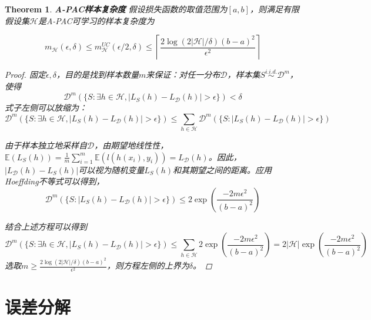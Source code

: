 \documentclass{article}
\newtheorem{theorem}{Theorem}
\newtheorem*{proof}{Proof}
\begin{document}
	\begin{theorem}
	\textbf{A-PAC样本复杂度} 假设损失函数的取值范围为$[a,b]$，则满足有限假设集$\mathcal{H}$是A-PAC可学习的样本复杂度为
	
	\begin{equation}
	m_\mathcal{H}(\epsilon,\delta)\leq m^{UC}_\mathcal{H}(\epsilon/2,\delta)\leq\left\lceil\frac{2\log(2|\mathcal{H}|/\delta)(b-a)^2}{\epsilon^2}\right\rceil
	\end{equation}
	
	\begin{proof}
	固定$\epsilon,\delta$，目的是找到样本数量$m$来保证：对任一分布$\mathcal{D}$，样本集$S\overset{i.i.d.}{\sim}\mathcal{D}^m$，使得
	\begin{equation*}
	\mathcal{D}^m(\{S:\exists h\in\mathcal{H}, |L_S(h)-L_\mathcal{D}(h)|>\epsilon\}) < \delta
	\end{equation*}
式子左侧可以放缩为：
	\begin{equation*}
	\mathcal{D}^m(\{S:\exists h\in\mathcal{H}, |L_S(h)-L_\mathcal{D}(h)|>\epsilon\}) \leq \sum_{h\in\mathcal{H}} \mathcal{D}^m(\{S:|L_S(h)-L_\mathcal{D}(h)|>\epsilon\})
	\end{equation*}

	由于样本独立地采样自$\mathcal{D}$，由期望地线性性，$\mathbb{E}(L_S(h))=\frac{1}{m}\sum_{i=1}^m \mathbb{E}(l(h(x_i),y_i))=L_\mathcal{D}(h)$。因此，$|L_\mathcal{D}(h)-L_S(h)|$可以视为随机变量$L_S(h)$和其期望之间的距离。应用Hoeffding不等式可以得到，
	\begin{equation*}
	\mathcal{D}^m(\{S:|L_S(h)-L_\mathcal{D}(h)|>\epsilon\}) \leq 2 \exp \left( \frac{-2m\epsilon^2 }{(b-a)^2} \right)
	\end{equation*}
	
	结合上述方程可以得到
	\begin{equation*}
	\mathcal{D}^m(\{S:\exists h\in\mathcal{H}, |L_S(h)-L_\mathcal{D}(h)|>\epsilon\}) \leq \sum_{h\in\mathcal{H}} 2 \exp \left( \frac{-2m\epsilon^2 }{(b-a)^2} \right) = 2|\mathcal{H}|\exp \left( \frac{-2m\epsilon^2 }{(b-a)^2} \right)
	\end{equation*}
	选取$m\geq\frac{2\log(2|\mathcal{H}|/\delta)(b-a)^2}{\epsilon^2}$，则方程左侧的上界为$\delta$。
	\end{proof}	
	\end{theorem}

\section{误差分解}
\end{document}
